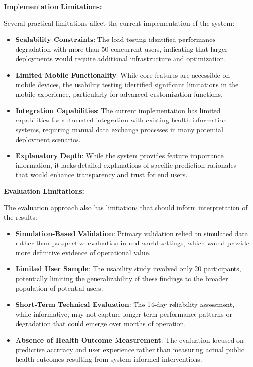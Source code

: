 \documentclass[12pt,a4paper]{report}
\begin{document}
\textbf{Implementation Limitations:}

Several practical limitations affect the current implementation of the system:

\begin{itemize}
    \item \textbf{Scalability Constraints}: The load testing identified performance degradation with more than 50 concurrent users, indicating that larger deployments would require additional infrastructure and optimization.
    
    \item \textbf{Limited Mobile Functionality}: While core features are accessible on mobile devices, the usability testing identified significant limitations in the mobile experience, particularly for advanced customization functions.
    
    \item \textbf{Integration Capabilities}: The current implementation has limited capabilities for automated integration with existing health information systems, requiring manual data exchange processes in many potential deployment scenarios.
    
    \item \textbf{Explanatory Depth}: While the system provides feature importance information, it lacks detailed explanations of specific prediction rationales that would enhance transparency and trust for end users.
\end{itemize}

\textbf{Evaluation Limitations:}

The evaluation approach also has limitations that should inform interpretation of the results:

\begin{itemize}
    \item \textbf{Simulation-Based Validation}: Primary validation relied on simulated data rather than prospective evaluation in real-world settings, which would provide more definitive evidence of operational value.
    
    \item \textbf{Limited User Sample}: The usability study involved only 20 participants, potentially limiting the generalizability of these findings to the broader population of potential users.
    
    \item \textbf{Short-Term Technical Evaluation}: The 14-day reliability assessment, while informative, may not capture longer-term performance patterns or degradation that could emerge over months of operation.
    
    \item \textbf{Absence of Health Outcome Measurement}: The evaluation focused on predictive accuracy and user experience rather than measuring actual public health outcomes resulting from system-informed interventions.
\end{itemize}
\end{document}
